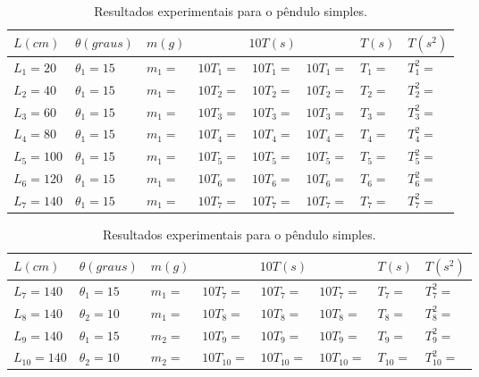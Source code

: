 \documentclass[10pt,a4paper,onecolumn,notitlepage]{scrartcl}
\begin{document}
\begin{table}
\centering
\renewcommand{\arraystretch}{1.5}
\begin{tabular}{|l|l|p{15mm}|p{15mm}|p{15mm}|p{15mm}|p{15mm}|p{15mm}|}
\hline
$L(cm)$ & $\theta (graus)$ & $m (g)$ & \multicolumn{3}{c|}{$10T (s)$}  & $T(s)$ & $T(s^2)$ \\
\hline
\hline
$L_1 = 20 $ & $\theta_1 = 15$ & $m_1 = $ & $10T_1 = $ & $10T_1 = $& $10T_1 = $& $T_1 = $ & $T_1^2 = $ \\
\hline
$L_2 = 40 $ & $\theta_1 = 15$ & $m_1 = $ & $10T_2 = $ & $10T_2 = $& $10T_2 = $& $T_2 = $ & $T_2^2 = $ \\
\hline
$L_3 = 60 $ & $\theta_1 = 15$ & $m_1 = $ & $10T_3 = $ & $10T_3 = $& $10T_3 = $& $T_3 = $ & $T_3^2 = $ \\
\hline
$L_4 = 80 $ & $\theta_1 = 15$ & $m_1 = $ & $10T_4 = $ & $10T_4 = $& $10T_4 = $& $T_4 = $ & $T_4^2 = $ \\
\hline
$L_5 = 100 $ & $\theta_1 = 15$ & $m_1 = $ & $10T_5 = $ & $10T_5 = $& $10T_5 = $& $T_5 = $ & $T_5^2 = $ \\
\hline
$L_6 = 120 $ & $\theta_1 = 15$ & $m_1 = $ & $10T_6 = $ & $10T_6 = $& $10T_6 = $& $T_6 = $ & $T_6^2 = $ \\
\hline
$L_7 = 140 $ & $\theta_1 = 15$ & $m_1 = $ & $10T_7 = $ & $10T_7 = $& $10T_7 = $& $T_7 = $ & $T_7^2 = $ \\
\hline
\end{tabular}
\caption{Resultados experimentais para o pêndulo simples.}
\label{tab:tabm1}
\end{table}

\begin{table}
\centering
\renewcommand{\arraystretch}{1.5}
\begin{tabular}{|l|l|p{15mm}|p{15mm}|p{15mm}|p{15mm}|p{15mm}|p{15mm}|}
\hline
$L(cm)$ & $\theta (graus)$ & $m (g)$ & \multicolumn{3}{c|}{$10T (s)$}  & $T(s)$ & $T(s^2)$ \\
\hline
\hline
$L_7 = 140 $ & $\theta_1 = 15$ & $m_1 = $ & $10T_7 = $ & $10T_7 = $& $10T_7 = $& $T_7 = $ & $T_7^2 = $ \\
\hline
$L_8 = 140 $ & $\theta_2 = 10$ & $m_1 = $ & $10T_8 = $ & $10T_8 = $& $10T_8 = $& $T_8 = $ & $T_8^2 = $ \\
\hline
$L_9 = 140 $ & $\theta_1 = 15$ & $m_2 = $ & $10T_9 = $ & $10T_9 = $& $10T_9 = $& $T_9 = $ & $T_9^2 = $ \\
\hline
$L_10 = 140 $ & $\theta_2 = 10$ & $m_2 = $ & $10T_{10} = $ & $10T_{10} = $& $10T_{10} = $& $T_{10} = $ & $T_{\text{10}}^\text{2} = $ \\
\hline
\end{tabular}
\caption{Resultados experimentais para o pêndulo simples.}
\label{tab:massaamplitude}
\end{table}
\end{document}
